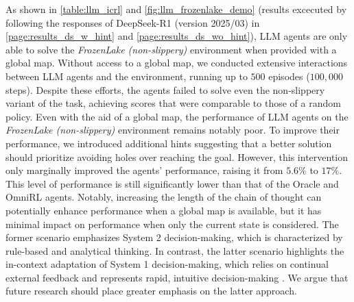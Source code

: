 \documentclass{article}
\renewcommand{\cite}[1]{\citep{#1}}
\begin{document}
As shown in \cref{table:llm_icrl} and \cref{fig:llm_frozenlake_demo} (results excecuted by following the responses of DeepSeek-R1 (version 2025/03) in \cref{page:results_ds_w_hint} and \cref{page:results_ds_wo_hint}), LLM agents are only able to solve the \emph{FrozenLake (non-slippery)} environment when provided with a global map. Without access to a global map, we conducted extensive interactions between LLM agents and the environment, running up to $500$ episodes ($100,000$ steps). Despite these efforts, the agents failed to solve even the non-slippery variant of the task, achieving scores that were comparable to those of a random policy.
Even with the aid of a global map, the performance of LLM agents on the \emph{FrozenLake (non-slippery)} environment remains notably poor. To improve their performance, we introduced additional hints suggesting that a better solution should prioritize avoiding holes over reaching the goal. However, this intervention only marginally improved the agents' performance, raising it from $5.6\%$ to $17\%$. This level of performance is still significantly lower than that of the Oracle and OmniRL agents.
Notably, increasing the length of the chain of thought can potentially enhance performance when a global map is available, but it has minimal impact on performance when only the current state is considered. The former scenario emphasizes System 2 decision-making, which is characterized by rule-based and analytical thinking. In contrast, the latter scenario highlights the in-context adaptation of System 1 decision-making, which relies on continual external feedback and represents rapid, intuitive decision-making \cite{wason1974dual,kahneman2011thinking}. We argue that future research should place greater emphasis on the latter approach.
\end{document}
